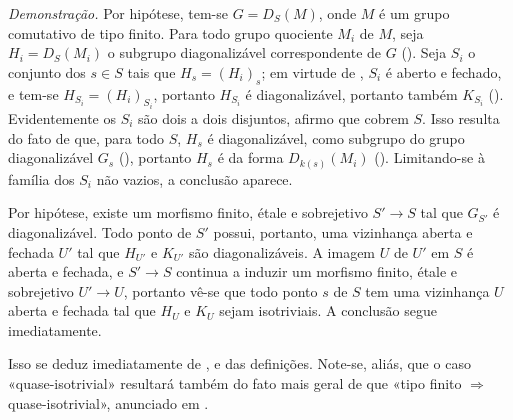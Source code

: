 \emph{Demonstração.}
 Por hipótese,
tem-se \(G=D_S(M)\), onde \(M\) é um grupo comutativo de tipo
finito. Para todo grupo quociente \(M_i\) de \(M\), seja
\(H_i=D_S(M_i)\) o subgrupo diagonalizável correspondente de \(G\)
(). Seja \(S_i\) o
conjunto dos \(s\in S\) tais que \(H_s=(H_i)_s\); em virtude de
, \(S_i\) é aberto e
fechado, e tem-se \(H_{S_i}=(H_i)_{S_i}\), portanto \(H_{S_i}\) é
diagonalizável, portanto também \(K_{S_i}\)
(). Evidentemente os
\(S_i\) são dois a dois disjuntos, afirmo que cobrem \(S\). Isso
resulta do fato de que, para todo \(S\), \(H_s\) é diagonalizável,
como subgrupo do grupo diagonalizável \(G_s\)
(), portanto \(H_s\)
é da forma \(D_{k(s)}(M_i)\)
(). Limitando-se à
família dos \(S_i\) não vazios, a conclusão
 aparece.

 Por hipótese,
existe um morfismo finito, étale e sobrejetivo \(S'\to S\) tal que
\(G_{S'}\) é diagonalizável. Todo ponto de \(S'\) possui, portanto, uma
vizinhança aberta e fechada \(U'\) tal que \(H_{U'}\) e \(K_{U'}\) são
diagonalizáveis. A imagem \(U\) de \(U'\) em \(S\) é aberta e fechada,
e \(S'\to S\) continua a induzir um morfismo finito, étale e sobrejetivo
\(U'\to U\), portanto vê-se que todo ponto \(s\) de \(S\) tem
uma vizinhança \(U\) aberta e fechada tal que \(H_U\) e \(K_U\)
sejam isotriviais. A conclusão
 segue
imediatamente.

 Isso se deduz
imediatamente de ,
 e das
definições. Note-se, aliás, que o caso «quase-isotrivial» resultará
também do fato mais geral de que «tipo finito
\(\Longrightarrow\) quase-isotrivial», anunciado em
.
